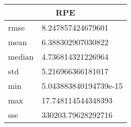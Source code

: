 \begin{table}[!ht] 
 \centering 
 \begin{tabular}{|l|l|} \hline 
 \multicolumn{2}{|c|}{RPE} \\ \hline 
 rmse & 8.247857424679601 \\ \hline 
mean & 6.388302907030822 \\ \hline 
median & 4.736814321226964 \\ \hline 
std & 5.216966366181017 \\ \hline 
min & 5.043883840194739e-15 \\ \hline 
max & 17.748114544348393 \\ \hline 
sse & 330203.79628292716 \\ \hline 
\end{tabular} 
 \end{table}